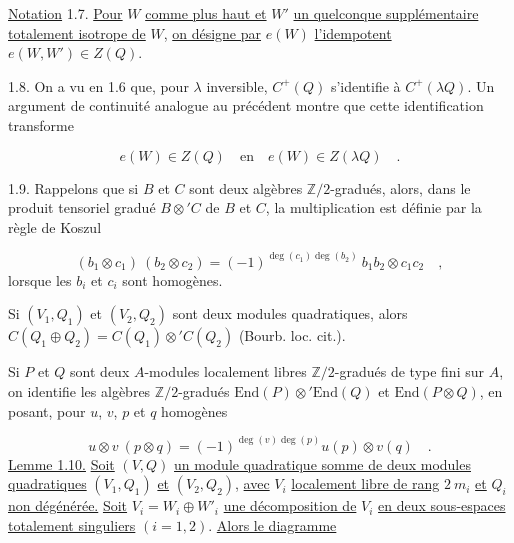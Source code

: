 \underline{Notation} 1.7. \underline{Pour} $W$ \underline{comme plus haut et} $W'$ \underline{un quelconque supplémentaire totalement isotrope de} $W$, \underline{on désigne par} $e(W)$ \underline{l'idempotent} $e(W,W') \in Z(Q)$.

1.8. On a vu en 1.6 que, pour $\lambda$ inversible, $C^+(Q)$ s'identifie à $C^+(\lambda Q)$. Un argument de continuité analogue au précédent montre que cette identification transforme

\begin{equation*}
e(W) \in Z(Q) \quad \mbox{en} \quad e(W) \in Z(\lambda Q) \quad .
\end{equation*}


1.9. Rappelons que si $B$ et $C$ sont deux algèbres $\mathbb{Z}/2$-gradués, alors, dans le produit tensoriel gradué $B \otimes' C$ de $B$ et $C$, la multiplication est définie par la règle de Koszul

\begin{equation*}
(b_1 \otimes c_1)\ (b_2 \otimes c_2) = (-1)^{\deg(c_1)\deg(b_2)}\ b_1 b_2 \otimes c_1 c_2 \quad ,
\end{equation*}
lorsque les $b_i$ et $c_i$ sont homogènes.

Si $(V_1, Q_1)$ et $(V_2, Q_2)$ sont deux modules quadratiques, alors $C(Q_1 \oplus Q_2) = C(Q_1) \otimes' C(Q_2)$ (Bourb. loc. cit.).

Si $P$ et $Q$ sont deux $A$-modules localement libres $\mathbb{Z}/2$-gradués de type fini sur $A$, on identifie les algèbres $\mathbb{Z}/2$-gradués $\mathrm{End}(P) \otimes' \mathrm{End}(Q)$ et $\mathrm{End}(P \otimes Q)$, en posant, pour $u$, $v$, $p$ et $q$ homogènes

\begin{equation*}
u \otimes v\ (p \otimes q) = (-1)^{\deg(v)\deg(p)} u(p) \otimes v(q) \quad .
\end{equation*}
\underline{Lemme 1.10.} \underline{Soit} $(V,Q)$ \underline{un module quadratique somme de deux modules quadratiques} $(V_1, Q_1)$ \underline{et} $(V_2, Q_2)$, \underline{avec} $V_i$ \underline{localement libre de rang} $2\ m_i$ \underline{et} $Q_i$ \underline{non dégénérée.} \underline{Soit} $V_i = W_i \oplus W'_i$ \underline{une décomposition de} $V_i$ \underline{en deux sous-espaces totalement singuliers} $(i = 1, 2)$. \underline{Alors le diagramme}

